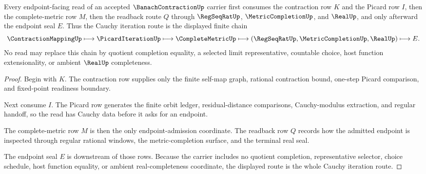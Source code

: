\begin{theorem}
\label{thm:banach-contraction-cauchy-orbit}
Every endpoint-facing read of an accepted $\BanachContractionUp$ carrier first consumes the contraction row $K$ and the Picard row $I$, then the complete-metric row $M$, then the readback route $Q$ through $\RegSeqRatUp$, $\MetricCompletionUp$, and $\RealUp$, and only afterward the endpoint seal $E$. Thus the Cauchy iteration route is the displayed finite chain
$$
\ContractionMappingUp\longmapsto\PicardIterationUp\longmapsto\CompleteMetricUp\longmapsto(\RegSeqRatUp,\MetricCompletionUp,\RealUp)\longmapsto E .
$$
No read may replace this chain by quotient completion equality, a selected limit representative, countable choice, host function extensionality, or ambient $\RealUp$ completeness.
\end{theorem}
\begin{proof}
Begin with $K$. The contraction row supplies only the finite self-map graph, rational contraction bound, one-step Picard comparison, and fixed-point readiness boundary.

Next consume $I$. The Picard row generates the finite orbit ledger, residual-distance comparisons, Cauchy-modulus extraction, and regular handoff, so the read has Cauchy data before it asks for an endpoint.

The complete-metric row $M$ is then the only endpoint-admission coordinate. The readback row $Q$ records how the admitted endpoint is inspected through regular rational windows, the metric-completion surface, and the terminal real seal.

The endpoint seal $E$ is downstream of those rows. Because the carrier includes no quotient completion, representative selector, choice schedule, host function equality, or ambient real-completeness coordinate, the displayed route is the whole Cauchy iteration route.
\end{proof}

